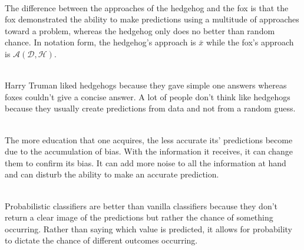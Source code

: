 \documentclass[12pt]{article}
\begin{document}


\begin{enumerate}

 \\
The difference between the approaches of the hedgehog and the fox is that the fox demonstrated the ability to make predictions using a multitude of approaches toward a problem, whereas the hedgehog only does no better than random chance. In notation form, the hedgehog's approach is $\bar{x}$ while the fox's approach is $\mathcal{A}(\mathcal{D},\mathcal{H})$. 


 \\
Harry Truman liked hedgehogs because they gave simple one answers whereas foxes couldn't give a concise answer. A lot of people don't think like hedgehogs because they usually create predictions from data and not from a random guess. 


 \\ 
The more education that one acquires, the less accurate its' predictions become due to the accumulation of bias. With the information it receives, it can change them to confirm its bias. It can add more noise to all the information at hand and can disturb the ability to make an accurate prediction. 

 \\
Probabilistic classifiers are better than vanilla classifiers because they don't return a clear image of the predictions but rather the chance of something occurring. Rather than saying which value is predicted, it allows for probability to dictate the chance of different outcomes occurring. 

\end{enumerate}
\end{document}
